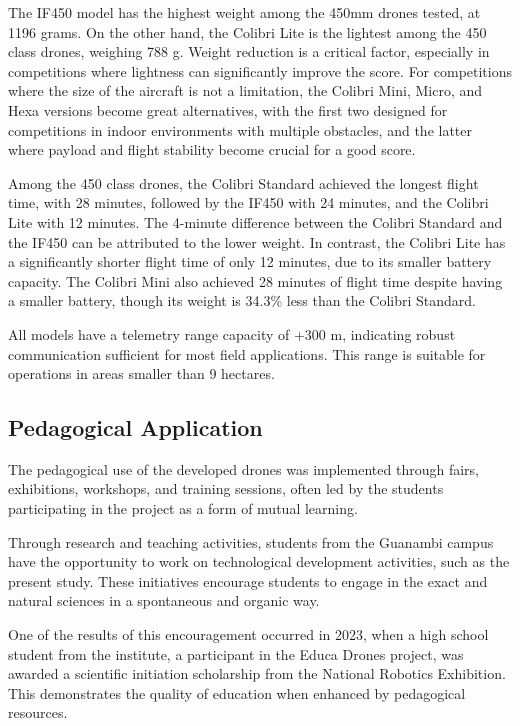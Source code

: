 \documentclass[conference]{IEEEtran}
\begin{document}
The IF450 model has the highest weight among the 450mm drones tested, at 1196 grams. On the other hand, the Colibri Lite is the lightest among the 450 class drones, weighing 788 g. Weight reduction is a critical factor, especially in competitions where lightness can significantly improve the score. For competitions where the size of the aircraft is not a limitation, the Colibri Mini, Micro, and Hexa versions become great alternatives, with the first two designed for competitions in indoor environments with multiple obstacles, and the latter where payload and flight stability become crucial for a good score.

Among the 450 class drones, the Colibri Standard achieved the longest flight time, with 28 minutes, followed by the IF450 with 24 minutes, and the Colibri Lite with 12 minutes. The 4-minute difference between the Colibri Standard and the IF450 can be attributed to the lower weight. In contrast, the Colibri Lite has a significantly shorter flight time of only 12 minutes, due to its smaller battery capacity. The Colibri Mini also achieved 28 minutes of flight time despite having a smaller battery, though its weight is 34.3\% less than the Colibri Standard.

All models have a telemetry range capacity of +300 m, indicating robust communication sufficient for most field applications. This range is suitable for operations in areas smaller than 9 hectares.

\subsection{Pedagogical Application}

The pedagogical use of the developed drones was implemented through fairs, exhibitions, workshops, and training sessions, often led by the students participating in the project as a form of mutual learning.

Through research and teaching activities, students from the Guanambi campus have the opportunity to work on technological development activities, such as the present study. These initiatives encourage students to engage in the exact and natural sciences in a spontaneous and organic way.

One of the results of this encouragement occurred in 2023, when a high school student from the institute, a participant in the Educa Drones project, was awarded a scientific initiation scholarship from the National Robotics Exhibition. This demonstrates the quality of education when enhanced by pedagogical resources.
\end{document}
